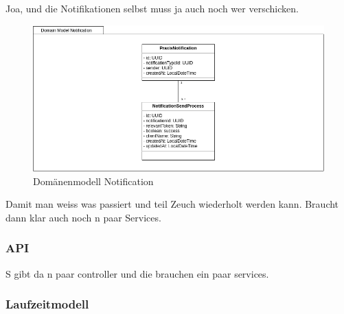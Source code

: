 Joa, und die Notifikationen selbst muss ja auch noch wer verschicken.

\begin{figure}[h]
    \centering
    \begin{minipage}[b]{1.0\textwidth}
        \includegraphics[width=\textwidth]{graphics/Class_Notification_Domain}
        \caption{Domänenmodell Notification}
    \end{minipage}
\end{figure}

Damit man weiss was passiert und teil Zeuch wiederholt werden kann.
Braucht dann klar auch noch n paar Services.




\clearpage
\subsubsection{API}

S gibt da n paar controller und die brauchen ein paar services.

\clearpage
\subsubsection{Laufzeitmodell}

\clearpage
